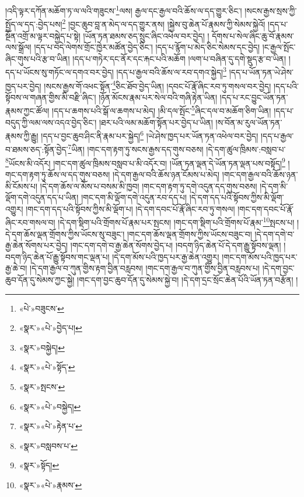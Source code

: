 །འདི་ལྟར་དཀོན་མཆོག་ཏ་ལ་ལའི་གཟུངས་\footnote{«པེ་»བཟུངས་}ལས། རྒྱལ་དང་རྒྱལ་བའི་ཆོས་ལ་དད་གྱུར་ཅིང་། །སངས་རྒྱས་སྲས་ཀྱི་སྤྱོད་ལ་དད་:བྱེད་པས།\footnote{«སྣར་»«པེ་»བྱེད་པ།} །བྱང་ཆུབ་བླ་ན་མེད་ལ་དད་གྱུར་ནས། །སྐྱེས་བུ་ཆེན་པོ་རྣམས་ཀྱི་སེམས་སྐྱེའོ། །དད་པ་སྔོན་འགྲོ་མ་ལྟར་བསྐྱེད་པ་སྟེ། །ཡོན་ཏན་ཐམས་ཅད་སྲུང་ཞིང་འཕེལ་བར་བྱེད། །
དོགས་པ་སེལ་ཞིང་ཆུ་བོ་རྣམས་ལས་སྒྲོལ། །དད་པ་བདེ་ལེགས་གྲོང་ཁྱེར་མཚོན་བྱེད་ཅིང་། །དད་པ་རྙོག་པ་མེད་ཅིང་སེམས་དང་བྱེད། །ང་རྒྱལ་སྤོང་ཞིང་གུས་པའི་རྩ་བ་ཡིན། །དད་པ་གཏེར་དང་ནོར་དང་རྐང་པའི་མཆོག །ལག་པ་བཞིན་དུ་དགེ་སྡུད་རྩ་བ་ཡིན། །དད་པ་ཡོངས་སུ་གཏོང་ལ་དགའ་བར་བྱེད། །དད་པ་རྒྱལ་བའི་ཆོས་ལ་རབ་དགའ་སྐྱེད།\footnote{«སྣར་»བསྐྱེད།} །དད་པ་ཡོན་ཏན་ཡེ་ཤེས་ཁྱད་པར་བྱེད། །སངས་རྒྱས་གོ་འཕང་སྟོན་\footnote{«སྣར་»«པེ་»སྟོད་}ཅིང་ཐོབ་བྱེད་ཡིན། །དབང་པོ་རྣོ་ཞིང་རབ་ཏུ་གསལ་བར་བྱེད། །དད་པའི་སྟོབས་ལ་གཞན་གྱིས་མི་བརྫི་ཞིང་། །ཉོན་མོངས་རྣམ་པར་སེལ་བའི་གཞི་རྟེན་ཡིན། །དད་པ་རང་བྱུང་ཡོན་ཏན་རྣམས་ཀྱང་ཚོལ། །དད་པ་ཆགས་པའི་སྒོ་ལ་ཆགས་པ་མེད། །མི་དལ་སྤོང་\footnote{«སྣར་»སྤངས་}ཞིང་དལ་བ་མཆོག་ཅིག་ཡིན། །དད་པ་བདུད་ཀྱི་ལམ་ལས་འདའ་བྱེད་ཅིང་། །ཐར་པའི་ལམ་མཆོག་སྟོན་པར་བྱེད་པ་ཡིན། །ས་བོན་མ་རུལ་ཡོན་ཏན་རྣམས་ཀྱི་རྒྱུ། །དད་པ་བྱང་ཆུབ་ཤིང་ནི་རྣམ་པར་སྐྱེད།\footnote{«སྣར་»«པེ་»བསྐྱེད།} །ཡེ་ཤེས་ཁྱད་པར་ཡོན་ཏན་འཕེལ་བར་བྱེད། །དད་པ་རྒྱལ་བ་ཐམས་ཅད་:སྟོན་བྱེད་\footnote{«སྣར་»«པེ་»རྟེན་པ་}ཡིན། །གང་དག་རྟག་ཏུ་སངས་རྒྱས་དད་གུས་བཅས། །དེ་དག་ཚུལ་ཁྲིམས་:བསླབ་པ་\footnote{«སྣར་»བསླབས་པ་}ཡོངས་མི་འདོར། །གང་དག་ཚུལ་ཁྲིམས་བསླབ་པ་མི་འདོར་བ། །ཡོན་ཏན་ལྡན་དེ་ཡོན་ཏན་ལྡན་པས་བསྟོད།\footnote{«སྣར་»སྟོད།} །གང་དག་རྟག་ཏུ་ཆོས་ལ་དད་གུས་བཅས། །དེ་དག་རྒྱལ་བའི་ཆོས་ཉན་ངོམས་པ་མེད། །གང་དག་རྒྱལ་བའི་ཆོས་ཉན་མི་ངོམས་པ། །དེ་དག་ཆོས་ལ་མོས་པ་བསམ་མི་ཁྱབ། །གང་དག་རྟག་ཏུ་དགེ་འདུན་དད་གུས་བཅས། །དེ་དག་མི་ལྡོག་དགེ་འདུན་དད་པ་ཡིན། །གང་དག་མི་ལྡོག་དགེ་འདུན་རབ་དད་པ། །དེ་དག་དད་པའི་སྟོབས་ཀྱིས་མི་ལྡོག་འགྱུར། །གང་དག་དད་པའི་སྟོབས་ཀྱིས་མི་ལྡོག་པ། །དེ་དག་དབང་པོ་རྣོ་ཞིང་རབ་ཏུ་གསལ། །གང་དག་དབང་པོ་རྣོ་ཞིང་རབ་གསལ་བ། །དེ་དག་སྡིག་པའི་གྲོགས་པོ་རྣམ་པར་སྤངས། །གང་དག་སྡིག་པའི་གྲོགས་པོ་རྣམ་\footnote{«སྣར་»«པེ་»རྣམས་}སྤངས་པ། །དེ་དག་ཆོས་ལྡན་གྲོགས་ཀྱིས་ཡོངས་སུ་བཟུང་། །གང་དག་ཆོས་ལྡན་གྲོགས་ཀྱིས་ཡོངས་བཟུང་བ། །དེ་དག་དགེ་བ་རྒྱ་ཆེན་སོགས་པར་བྱེད། །གང་དག་དགེ་བ་རྒྱ་ཆེན་སོགས་བྱེད་པ། །བདག་ཉིད་ཆེན་པོ་དེ་དག་རྒྱུ་སྟོབས་ལྡན། །བདག་ཉིད་ཆེན་པོ་རྒྱུ་སྟོབས་གང་ལྡན་པ། །དེ་དག་མོས་པའི་ཁྱད་པར་རྒྱ་ཆེན་འགྱུར། །གང་དག་མོས་པའི་ཁྱད་པར་རྒྱ་ཆེ་བ། །དེ་དག་རྒྱལ་བ་ཀུན་གྱིས་རྟག་བྱིན་བརླབས། །གང་དག་རྒྱལ་བ་ཀུན་གྱིས་བྱིན་བརླབས་པ། །དེ་དག་བྱང་ཆུབ་དོན་དུ་སེམས་ཀྱང་སྐྱེ། །གང་དག་བྱང་ཆུབ་དོན་དུ་སེམས་སྐྱེ་བ། །དེ་དག་དྲང་སྲོང་ཆེན་པོའི་ཡོན་ཏན་བརྩོན། །
